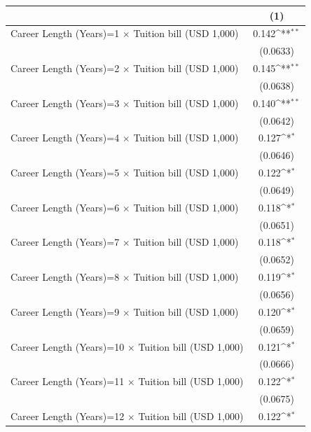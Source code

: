 {
\def\sym#1{\ifmmode^{#1}\else\(^{#1}\)\fi}
\begin{tabular}{l*{1}{c}}
\hline\hline
                    &\multicolumn{1}{c}{(1)}         \\
\hline
Career Length (Years)=1 $\times$ Tuition bill (USD 1,000)&       0.142\sym{**} \\
                    &    (0.0633)         \\
[1em]
Career Length (Years)=2 $\times$ Tuition bill (USD 1,000)&       0.145\sym{**} \\
                    &    (0.0638)         \\
[1em]
Career Length (Years)=3 $\times$ Tuition bill (USD 1,000)&       0.140\sym{**} \\
                    &    (0.0642)         \\
[1em]
Career Length (Years)=4 $\times$ Tuition bill (USD 1,000)&       0.127\sym{*}  \\
                    &    (0.0646)         \\
[1em]
Career Length (Years)=5 $\times$ Tuition bill (USD 1,000)&       0.122\sym{*}  \\
                    &    (0.0649)         \\
[1em]
Career Length (Years)=6 $\times$ Tuition bill (USD 1,000)&       0.118\sym{*}  \\
                    &    (0.0651)         \\
[1em]
Career Length (Years)=7 $\times$ Tuition bill (USD 1,000)&       0.118\sym{*}  \\
                    &    (0.0652)         \\
[1em]
Career Length (Years)=8 $\times$ Tuition bill (USD 1,000)&       0.119\sym{*}  \\
                    &    (0.0656)         \\
[1em]
Career Length (Years)=9 $\times$ Tuition bill (USD 1,000)&       0.120\sym{*}  \\
                    &    (0.0659)         \\
[1em]
Career Length (Years)=10 $\times$ Tuition bill (USD 1,000)&       0.121\sym{*}  \\
                    &    (0.0666)         \\
[1em]
Career Length (Years)=11 $\times$ Tuition bill (USD 1,000)&       0.122\sym{*}  \\
                    &    (0.0675)         \\
[1em]
Career Length (Years)=12 $\times$ Tuition bill (USD 1,000)&       0.122\sym{*}  \\

\end{tabular}}
